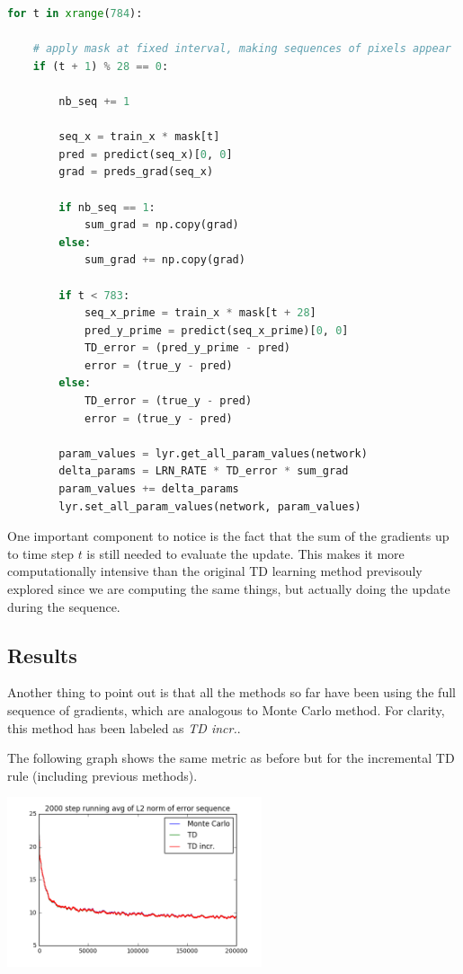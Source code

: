 \documentclass{article}
\begin{document}
\begin{lstlisting}[language=Python]
  for t in xrange(784):

    # apply mask at fixed interval, making sequences of pixels appear
    if (t + 1) % 28 == 0:

        nb_seq += 1

        seq_x = train_x * mask[t]
        pred = predict(seq_x)[0, 0]
        grad = preds_grad(seq_x)

        if nb_seq == 1:
            sum_grad = np.copy(grad)
        else:
            sum_grad += np.copy(grad)

        if t < 783:
            seq_x_prime = train_x * mask[t + 28]
            pred_y_prime = predict(seq_x_prime)[0, 0]
            TD_error = (pred_y_prime - pred)
            error = (true_y - pred)
        else:
            TD_error = (true_y - pred)
            error = (true_y - pred)

        param_values = lyr.get_all_param_values(network)
        delta_params = LRN_RATE * TD_error * sum_grad
        param_values += delta_params
        lyr.set_all_param_values(network, param_values)
\end{lstlisting}

One important component to notice is the fact that the sum of the gradients up to time step $t$ is still needed to evaluate the update. This makes it more computationally intensive than the original TD learning method previsouly explored since we are computing the same things, but actually doing the update during the sequence.

\subsection{Results}

Another thing to point out is that all the methods so far have been using the full sequence of gradients, which are analogous to Monte Carlo method. For clarity, this method has been labeled as \textit{TD incr.}.

The following graph shows the same metric as before but for the incremental TD rule (including previous methods).

\begin{center}
  \includegraphics[width=75mm]{figures/plot_TD_incr_grad_L2_norm_error.png}
\end{center}
\end{document}
